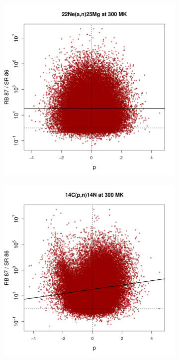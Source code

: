 \begin{figure}[t]
\begin{subfigure}[b]{0.495\textwidth}
\includegraphics[width=\textwidth]{Chapter-3/figs/CorrRB87SR86_22Ne_a_n_25Mg_300MK.png}
\end{subfigure}
\begin{subfigure}[b]{0.495\textwidth}   
\centering 
\includegraphics[width=\textwidth]{Chapter-3/figs/CorrRB87SR86_14C_p_n_14N_300MK.png}

\end{subfigure}
\end{figure}

